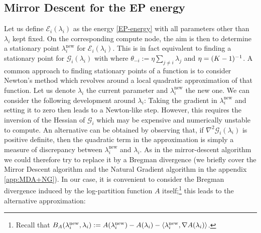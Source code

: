 \subsection{\label{point:MD-for-EP}Mirror Descent for the EP energy}
Let us define $\mathcal E_i(\lambda_i)$ as the energy \eqref{EP-energy} with all parameters other than $\lambda_i$ kept fixed. On the corresponding compute node, the aim is then to determine a stationary point $\lambda_i^{\text{new}}$ for $\mathcal E_i(\lambda_i)$. This is in fact equivalent to finding a stationary point for $\mathcal G_i(\lambda_i)$ with
where $\theta_{-i}:=\eta\sum_{j\neq i}\lambda_j$ and $\eta=(K-1)^{-1}$. A common approach to finding stationary points of a function is to consider Newton's method which revolves around a local quadratic approximation of that function. Let us denote $\lambda_i$ the current parameter and $\lambda_i^{\text{new}}$ the new one. We can consider the following development around $\lambda_i$:
%
%
Taking the gradient in $\lambda_i^{\text{new}}$ and setting it to zero then leads to a Newton-like step. However, this requires the inversion of the Hessian of $\mathcal G_i$ which may be expensive and numerically unstable to compute. An alternative can be obtained by observing that, if $\nabla^{2}\mathcal G_i(\lambda_i)$ is positive definite, then the quadratic term in the approximation is simply a measure of discrepancy between $\lambda_i^{\text{new}}$ and $\lambda_i$. As in the mirror-descent algorithm \citep{nemirovski83, beck03} we could therefore try to replace it by a Bregman divergence (we briefly cover the Mirror Descent algorithm and the Natural Gradient algorithm in the appendix \ref{app:MDA+NG}). In our case, it is convenient to consider the Bregman divergence induced by the log-partition function $A$ itself;\footnote{Recall that $B_A(\lambda_i^{\text{new}},\lambda_i):=A(\lambda_i^{\text{new}})-A(\lambda_i)-\left\langle \lambda_i^{\text{new}},\nabla A(\lambda_i) \right\rangle$.} this leads to the alternative approximation:
